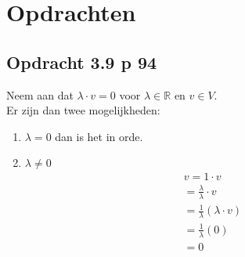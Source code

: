 \documentclass[lineaire_algebra_oplossingen.tex]{subfiles}
\begin{document}
\section{Opdrachten}
\subsection{Opdracht 3.9 p 94}
Neem aan dat $\lambda \cdot v = 0$ voor $\lambda \in \mathbb{R}$ en $v \in V$.\\
Er zijn dan twee mogelijkheden:\\
\begin{enumerate}
\item $\lambda = 0$ dan is het in orde.
\item $\lambda \neq 0$
\begin{align*}
v = 1\cdot v \tag{co\"efficient}
\\
= \frac{\lambda}{\lambda}\cdot v
\\
= \frac{1}{\lambda}(\lambda \cdot v) \tag{gemegde associativiteit}
\\
= \frac{1}{\lambda}(0) \tag{lemma 3.8.1}
\\
= 0
\end{align*}
\end{enumerate}
\end{document}
